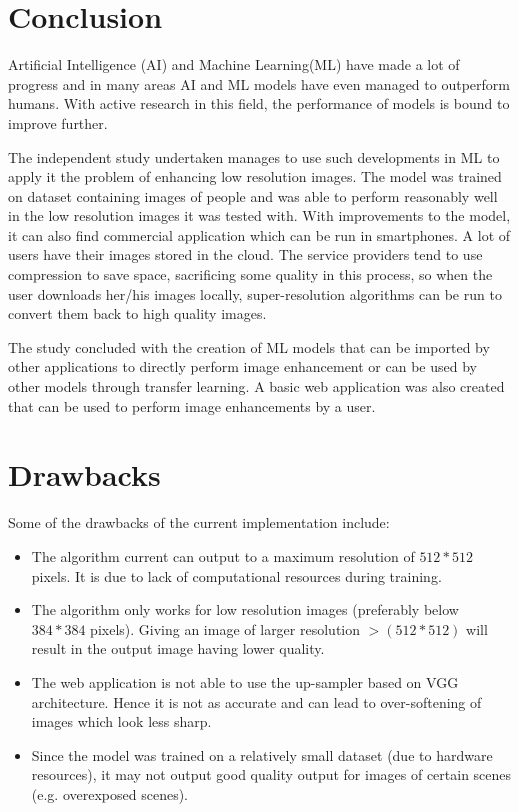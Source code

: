 \documentclass[conference]{IEEEtran}
\begin{document}
	\section{Conclusion}
		Artificial Intelligence (AI) and Machine Learning(ML) have made a lot of progress and in many areas AI and ML models have even managed to outperform humans. With active research in this field, the performance of models is bound to improve further.
		\par The independent study undertaken manages to use such developments in ML to apply it the problem of enhancing low resolution images. The model was trained on dataset containing images of people and was able to perform reasonably well in the low resolution images it was tested with. With improvements to the model, it can also find commercial application which can be run in smartphones. A lot of users have their images stored in the cloud. The service providers tend to use compression to save space, sacrificing some quality in this process, so when the user downloads her/his images locally, super-resolution algorithms can be run to convert them back to high quality images.
		\par The study concluded with the creation of ML models that can be imported by other applications to directly perform image enhancement or can be used by other models through transfer learning. A basic web application was also created that can be used to perform image enhancements by a user.
		
	\section{Drawbacks}
		Some of the drawbacks of the current implementation include:
		\begin{itemize}
			\item The algorithm current can output to a maximum resolution of $512 * 512$ pixels. It is due to lack of computational resources during training.
			\item The algorithm only works for low resolution images (preferably below $384 * 384$ pixels). Giving an image of larger resolution $>(512 * 512)$ will result in the output image having lower quality.
			\item The web application is not able to use the up-sampler based on VGG architecture. Hence it is not as accurate and can lead to over-softening of images which look less sharp.
			\item Since the model was trained on a relatively small dataset (due to hardware resources), it may not output good quality output for images of certain scenes (e.g. overexposed scenes). 
		\end{itemize}
	
\end{document}
